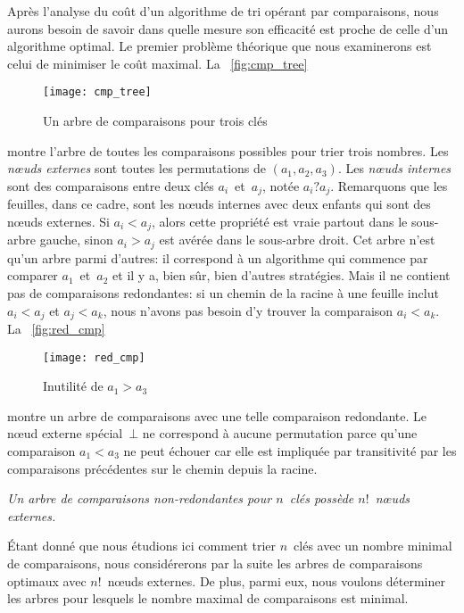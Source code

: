 Après l'analyse du coût d'un algorithme de tri opérant par
comparaisons, nous aurons besoin de savoir dans quelle mesure son
efficacité est proche de celle d'un algorithme
optimal. Le premier problème théorique que
nous examinerons est celui de minimiser le coût maximal. La
\fig~\vref{fig:cmp_tree}
\begin{figure}
\centering
\texttt{[image: cmp\_tree]}
\caption{Un arbre de comparaisons pour trois clés}
\label{fig:cmp_tree}
\end{figure}
montre l'arbre de toutes les comparaisons possibles
 pour trier trois
nombres. Les \emph{nœuds externes}
\label{def:external_node} sont toutes les
permutations de \((a_1,a_2,a_3)\). Les
\emph{nœuds internes} sont
des comparaisons entre deux clés \(a_i\)~et~\(a_j\), notée
\(a_i?a_j\). Remarquons que les feuilles, dans ce cadre, sont les
nœuds internes avec deux enfants qui sont des nœuds externes.
Si \({a_i < a_j}\), alors cette propriété est vraie partout dans le
sous-arbre gauche, sinon \({a_i > a_j}\) est avérée dans le sous-arbre
droit. Cet arbre n'est qu'un arbre parmi d'autres: il correspond à un
algorithme qui commence par comparer \(a_1\)~et~\(a_2\) et il y a,
bien sûr, bien d'autres stratégies. Mais il ne contient pas de
comparaisons redondantes: si un chemin de la racine à une feuille
inclut \({a_i < a_j}\) et \({a_j < a_k}\), nous n'avons pas besoin d'y
trouver la comparaison \({a_i < a_k}\). La \fig~\vref{fig:red_cmp}
\begin{figure}
\centering
\texttt{[image: red\_cmp]}
\caption{Inutilité de \(a_1 > a_3\)}
\label{fig:red_cmp}
\end{figure}
montre un arbre de comparaisons avec une telle comparaison
redondante. Le nœud externe spécial~\(\bot\) ne correspond à
aucune permutation parce qu'une comparaison \({a_1 < a_3}\) ne peut
échouer car elle est impliquée par transitivité par les comparaisons
précédentes sur le chemin depuis la racine.
\begin{center}
  \emph{Un arbre de comparaisons non-redondantes pour \(n\)~clés
    possède \(n!\)~nœuds externes.}
\end{center}
Étant donné que nous étudions ici comment trier \(n\)~clés avec un
nombre minimal de comparaisons, nous considérerons par la suite les
arbres de comparaisons optimaux avec \(n!\)~nœuds externes. De
plus, parmi eux, nous voulons déterminer les arbres pour lesquels le
nombre maximal de comparaisons est minimal.

